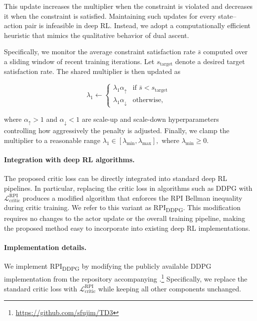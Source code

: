 \documentclass[twoside]{article}
\theoremstyle{plain}
\theoremstyle{definition}
\theoremstyle{remark}
\newcommand{\rpiddpg}{RPI\textsubscript{DDPG}}
\begin{document}
This update increases the multiplier when the constraint is violated and
decreases it when the constraint is satisfied. Maintaining such updates for
every state–action pair is infeasible in deep RL. Instead, we adopt a
computationally efficient heuristic that mimics the qualitative behavior of
dual ascent.

Specifically, we monitor the average constraint satisfaction rate
$\bar{s}$ computed over a sliding window of recent training iterations.
Let $s_{\text{target}}$ denote a desired target satisfaction rate.
The shared multiplier is then updated as

\[
\lambda_1
\leftarrow
\begin{cases}
\lambda_1 \alpha_\uparrow & \text{if } \bar{s} < s_{\text{target}} \\
\lambda_1 \alpha_\downarrow & \text{otherwise},
\end{cases}
\]

where $\alpha_\uparrow > 1$ and $\alpha_\downarrow < 1$ are scale-up and
scale-down hyperparameters controlling how aggressively the penalty is
adjusted. Finally, we clamp the multiplier to a reasonable range
$\lambda_1 \in [\lambda_{\min},\lambda_{\max}],$ where $\lambda_{\min} \ge 0$.

\paragraph{Integration with deep RL algorithms.}

The proposed critic loss can be directly integrated into standard deep RL
pipelines. In particular, replacing the critic loss in algorithms such as
DDPG with $\mathcal L^{\text{RPI}}_{\text{critic}}$ produces a modified
algorithm that enforces the RPI Bellman inequality during critic training.
We refer to this variant as RPI\textsubscript{DDPG}. This modification requires no changes to the actor update or the overall
training pipeline, making the proposed method easy to incorporate into
existing deep RL implementations.

\paragraph{Implementation details.}

We implement \rpiddpg{} by modifying the publicly available DDPG implementation from the repository accompanying \citep{td3}.\footnote{\url{https://github.com/sfujim/TD3}} 
Specifically, we replace the standard critic loss with $\mathcal L^{\text{RPI}}_{\text{critic}}$ while keeping all other components unchanged.
\end{document}
